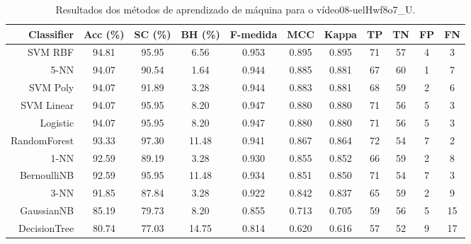 \begin{table}[!htb]
\centering
\caption{Resultados dos métodos de aprendizado de máquina para o vídeo08-uelHwf8o7_U.}
\label{tab:08-uelHwf8o7_U}
\begin{tabular}{r|c|c|c|c|c|c|c|c|c|c}
\hline\hline
Classifier & Acc (\%) & SC (\%) & BH (\%) & F-medida & MCC & Kappa & TP & TN & FP & FN \\ \hline
SVM RBF & 94.81 & 95.95 & 6.56 & 0.953 & 0.895 & 0.895 & 71 & 57 & 4 & 3 \\ 
5-NN & 94.07 & 90.54 & 1.64 & 0.944 & 0.885 & 0.881 & 67 & 60 & 1 & 7 \\ 
SVM Poly & 94.07 & 91.89 & 3.28 & 0.944 & 0.883 & 0.881 & 68 & 59 & 2 & 6 \\ 
SVM Linear & 94.07 & 95.95 & 8.20 & 0.947 & 0.880 & 0.880 & 71 & 56 & 5 & 3 \\ 
Logistic & 94.07 & 95.95 & 8.20 & 0.947 & 0.880 & 0.880 & 71 & 56 & 5 & 3 \\ 
RandomForest & 93.33 & 97.30 & 11.48 & 0.941 & 0.867 & 0.864 & 72 & 54 & 7 & 2 \\ 
1-NN & 92.59 & 89.19 & 3.28 & 0.930 & 0.855 & 0.852 & 66 & 59 & 2 & 8 \\ 
BernoulliNB & 92.59 & 95.95 & 11.48 & 0.934 & 0.851 & 0.850 & 71 & 54 & 7 & 3 \\ 
3-NN & 91.85 & 87.84 & 3.28 & 0.922 & 0.842 & 0.837 & 65 & 59 & 2 & 9 \\ 
GaussianNB & 85.19 & 79.73 & 8.20 & 0.855 & 0.713 & 0.705 & 59 & 56 & 5 & 15 \\ 
DecisionTree & 80.74 & 77.03 & 14.75 & 0.814 & 0.620 & 0.616 & 57 & 52 & 9 & 17 \\ 
\hline\hline
\end{tabular}
\end{table}
